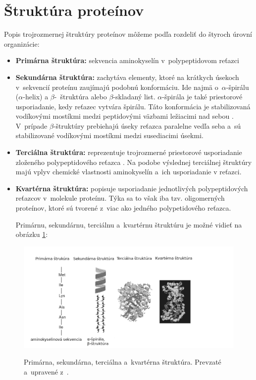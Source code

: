 \section{Štruktúra proteínov}
Popis trojrozmernej štruktúry proteínov môžeme podľa \cite{aminokyseliny} rozdeliť do štyroch úrovní organizácie:

\begin{itemize}
	\item \textbf{Primárna štruktúra:} sekvencia aminokyselín v~polypeptidovom reťazci
	\item \textbf{Sekundárna štruktúra:} zachytáva elementy, ktoré na krátkych úsekoch v~sekvencií proteínu zaujímajú podobnú konformáciu. Ide najmä o~$\alpha$\--špirálu ($\alpha$\--helix) a $\beta$\--~štruktúra alebo $\beta$\--skladaný list. $\alpha$\--špirála je také priestorové usporiadanie, kedy reťazec vytvára špirálu. Táto konformácia je stabilizovaná vodíkovými mostíkmi medzi peptidovými väzbami ležiacimi nad sebou \cite{aminokyseliny}. V~prípade $\beta$\--štruktúry prebiehajú úseky reťazca paralelne vedľa seba a~sú stabilizované vodíkovými mostíkmi medzi susediacimi úsekmi.
	\item \textbf{Terciálna štruktúra:} reprezentuje trojrozmerné priestorové usporiadanie zloženého polypeptidového reťazca \cite{aminokyseliny}. Na podobe výslednej terciálnej štruktúry majú vplyv chemické vlastnosti aminokyselín a~ich usporiadanie v reťazci. 
	\item \textbf{Kvartérna štruktúra:} popisuje usporiadanie jednotlivých polypeptidových reťazcov v~molekule proteínu. Týka sa to však iba tzv. oligomerných proteínov, ktoré sú tvorené z~viac ako jedného polypetidového reťazca.
	
	Primárnu, sekundárnu, terciálnu a~kvartérnu štruktúru je možné vidieť na obrázku \ref{struktura}:
\end{itemize}
\begin{figure}[H]
		\begin{center}
		\scalebox{0.5}
		{   
			\includegraphics{structure.png}
		}
		\caption{Primárna, sekundárna, terciálna a~kvartérna štruktúra. Prevzaté a~upravené z~\cite{gromiha}.}
		\label{struktura}
	\end{center}
\end{figure}


